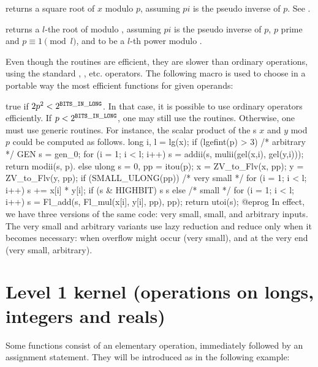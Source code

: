  returns a square root
of $x$ modulo $p$, assuming $pi$ is the pseudo inverse of $p$.
See .

returns a $l$-the root of 
modulo , assuming $pi$ is the pseudo inverse of $p$,
$p$ prime and $p \equiv 1 \pmod{l}$, and  to be a $l$-th power modulo
.


Even though the  routines are efficient, they are slower than
ordinary  operations, using the standard \kbd{+}, \kbd{\%}, etc.
operators.
The following macro is used to choose in a portable way the most efficient
functions for given operands:

 true if $2p^2 <2^{\tt BITS\_IN\_LONG}$. In that case, it is
possible to use ordinary operators efficiently. If $p < 2^{\tt BITS\_IN\_LONG}$, one
may still use the  routines. Otherwise, one must use generic
routines. For instance, the scalar product of the s $x$ and $y$ mod
$p$ could be computed as follows.
\bprog
    long i, l = lg(x);
    if (lgefint(p) > 3)
    { /* arbitrary */
      GEN s = gen_0;
      for (i = 1; i < l; i++) s = addii(s, mulii(gel(x,i), gel(y,i)));
      return modii(s, p).
    }
    else
    {
      ulong s = 0, pp = itou(p);
      x = ZV_to_Flv(x, pp);
      y = ZV_to_Flv(y, pp);
      if (SMALL_ULONG(pp))
      { /* very small */
        for (i = 1; i < l; i++)
        {
          s += x[i] * y[i];
          if (s & HIGHBIT) s %
        }
        s %
      }
      else
      { /* small */
        for (i = 1; i < l; i++)
          s = Fl_add(s, Fl_mul(x[i], y[i], pp), pp);
      }
      return utoi(s);
    }
@eprog\noindent
In effect, we have three versions of the same code: very small, small, and
arbitrary inputs. The very small and arbitrary variants use lazy reduction
and reduce only when it becomes necessary: when overflow might occur (very
small), and at the very end (very small, arbitrary).

\section{Level 1 kernel (operations on longs, integers and reals)}

 Some functions consist of an elementary operation,
immediately followed by an assignment statement. They will be introduced as
in the following example:

